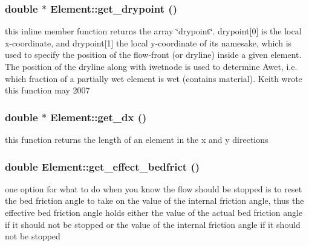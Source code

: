 \hypertarget{classElement_a127}{
\subsubsection[get\_\-drypoint]{\setlength{\rightskip}{0pt plus 5cm}double $\ast$ Element::get\_\-drypoint ()}}
\label{classElement_a127}


this inline member function returns the array \char`\"{}drypoint\char`\"{}. drypoint\mbox{[}0\mbox{]} is the local x-coordinate, and drypoint\mbox{[}1\mbox{]} the local y-coordinate of its namesake, which is used to specify the position of the flow-front (or dryline) inside a given element. The position of the dryline along with iwetnode is used to determine Awet, i.e. which fraction of a partially wet element is wet (contains material). Keith wrote this function may 2007 

\hypertarget{classElement_a68}{
\subsubsection[get\_\-dx]{\setlength{\rightskip}{0pt plus 5cm}double $\ast$ Element::get\_\-dx ()}}
\label{classElement_a68}


this function returns the length of an element in the x and y directions 

\hypertarget{classElement_a119}{
\subsubsection[get\_\-effect\_\-bedfrict]{\setlength{\rightskip}{0pt plus 5cm}double Element::get\_\-effect\_\-bedfrict ()}}
\label{classElement_a119}


one option for what to do when you know the flow should be stopped is to reset the bed friction angle to take on the value of the internal friction angle, thus the effective bed friction angle holds either the value of the actual bed friction angle if it should not be stopped or the value of the internal friction angle if it should not be stopped 

